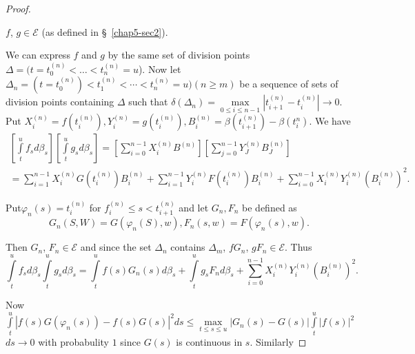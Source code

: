 \begin{proof}
\setcounter{case}{0}
\begin{case}%
 $f$, $g \in  \mathscr{E}$ (as defined in \S\ \ref{chap5-sec2}). 
\end{case}
  
We can express $f$ and $g$ by the same set of division points
  $\Delta = ( t = t_0^{(n)}<\ldots < t^{(n)}_n = u $). Now let
  $\Delta_n = (t = t_0^{(n)}) < t_1^{(n)} < \cdots < t_n^{(n)} = u
  ) (n \geq m)$ be a sequence of sets of division points containing
  $\Delta$ such that $\delta (\Delta _n) = \max\limits_{ 0 \leq
    i \leq n - 1} |t^{(n)}_{i +1} - t^{(n)}_i |\to 0$. Put $ X_i^{(n)} =
  f (t^{(n)}_i) , Y^{(n)}_i = g(t_i^{(n)}), B_i^{(n)} = \beta
  (t_{i+1}^{(n)}) - \beta(t_i^{n})$. We have   
\begin{multline*}
 \left[ \int \limits^u _t f _s d \beta _s \right] \left[
      \int\limits^u _t g_s d \beta _s \right] = \left[ \sum^{ n - 1}_{
        i =0} X_i ^{(n)} B^{(n)}\right] \left[ \sum^{ n -1}_{ j = 0}
      Y^{(n)}_J B^{(n)}_J\right] \\ 
    = \sum^{ n - 1}_{ i = 1} X_i^{(n)} G (t_i ^{(n)}) B_i ^{(n)} +
    \sum_{ i = 1}^{ n - 1} Y_i^{(n)} F(t_i ^{(n)}) B_i^{(n)}+ \sum^{ n
      - 1}_{ i = 0} X_i ^{(n)} Y_i ^{(n)} (B_i ^{(n)})^{2}.  
\end{multline*}

Put\pageoriginale $\varphi _n (s) = t_i ^{(n)}$ for $f^{(n)}_i \leq s < t_{ i +
    1}^{(n)}$ and let $G_n, F_n$ be defined as  
  $$
  G_n (S, W) = G(\varphi_n (S), w), F_n (s, w) = F(\varphi_n (s), w). 
  $$

  Then $G_n$, $F_n \in \mathscr{E}$ and since the set $\Delta_n$
  contains $\Delta_{m}$, $f G_n$, $g F_n \in \mathscr{E}$. Thus  
  $$
  \int\limits^u_t f_s d \beta _s \int\limits^u_t g_s d \beta _s =
  \int\limits^u_t f (s) G_n (s) d \beta_s + \int\limits^u_t g_s F_n d
  \beta_s + \sum^{ n - 1}_{ i = 0} X_i ^{(n)} Y^{(n)}_i (B^{(n)}_i)^2.  
  $$

  Now $\int\limits^u_t | f (s) G (\varphi_n (s))- f (s) G(s)|^2 ds \leq
  \max\limits_{t \leq s \leq u}| G_n (s) - G(s) | \int\limits^u_t|
  f(s)|^2$ $ds \to 0$ with probabulity $1$ since $G(s)$ is continuous in
  $s$. Similarly  
  

\end{proof}
